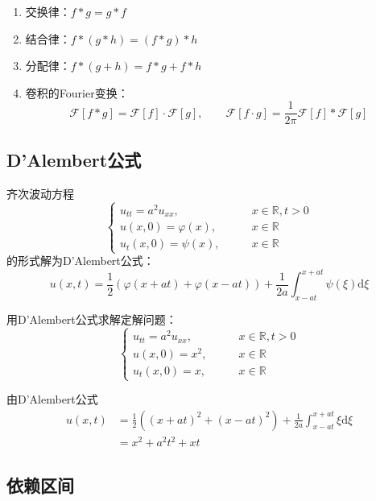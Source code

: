 \documentclass[lang = cn, scheme = chinese, thmcnt = section]{elegantbook}
\newcommand{\R}{\mathbb{R}}            %
\newcommand{\dd}{\mathrm{d}}           %
\begin{document}
\begin{property}
	\begin{enumerate}
		\item 交换律：$f*g=g*f$
		\item 结合律：$f*(g*h)=(f*g)*h$
		\item 分配律：$f*(g+h)=f*g+f*h$
		\item 卷积的Fourier变换：%
		$$
		\mathscr{F}[f*g]=\mathscr{F}[f]\cdot\mathscr{F}[g],\qquad 
		\mathscr{F}[f\cdot g]=\frac{1}{2\pi}\mathscr{F}[f]*\mathscr{F}[g]
		$$
	\end{enumerate}
\end{property}

\subsection{D'Alembert公式}

\begin{note}
	齐次波动方程
	$$
	\begin{cases}
		u_{tt}=a^2u_{xx},\qquad & x\in \R,t>0\\
		u(x,0)=\varphi(x),\qquad & x\in \R\\
		u_t(x,0)=\psi(x),\qquad & x\in \R
	\end{cases}
	$$
	的形式解为D'Alembert公式：
	$$
	u(x,t)=\frac{1}{2}(\varphi(x+at)+\varphi(x-at))+\frac{1}{2a}\int_{x-at}^{x+at}\psi(\xi)\dd\xi
	$$
\end{note}

\begin{example}
	用D'Alembert公式求解定解问题：
	$$
	\begin{cases}
		u_{tt}=a^2u_{xx},\qquad & x\in \R,t>0\\
		u(x,0)=x^2,\qquad & x\in \R\\
		u_t(x,0)=x,\qquad & x\in \R
	\end{cases}
	$$
\end{example}

\begin{solution}
	由D'Alembert公式
	\begin{align*}
		u(x,t)
		& = \frac{1}{2}((x+at)^2+(x-at)^2)+\frac{1}{2a}\int_{x-at}^{x+at}\xi\dd\xi\\
		& = x^2+a^2t^2+xt
	\end{align*}
\end{solution}

\subsection{依赖区间}
\end{document}
